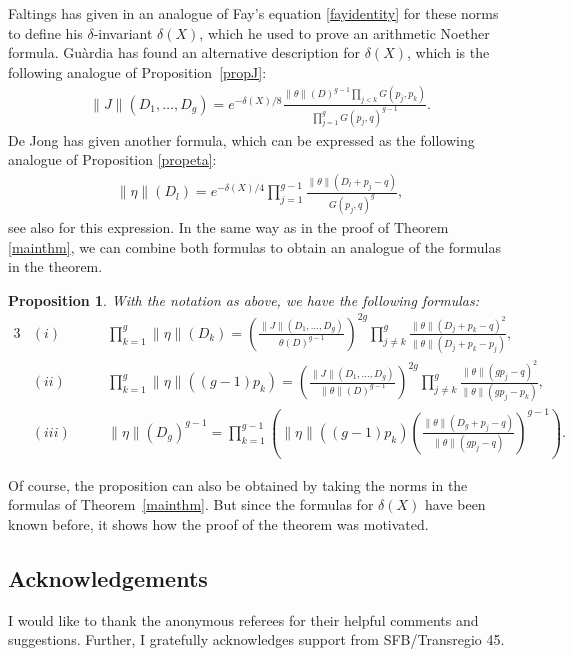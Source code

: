 \documentclass[10pt,a4paper]{amsart}
\numberwithin{equation}{section}
\newtheorem{Proposition}[Theorem]{Proposition}
 { \theoremstyle{definition}
\newtheorem{Definition}[Theorem]{Definition}
\newtheorem{Note}[Theorem]{Note}
\newtheorem{Example}[Theorem]{Example}
\newtheorem{Remark}[Theorem]{Remark} }
\begin{document}
Faltings has given in \cite[p.~402]{Fal84} an analogue of Fay's equation \eqref{fayidentity} for these norms to define his $\delta$-invariant $\delta(X)$, which he used to prove an arithmetic Noether formula. Gu\`ardia \cite[Corollary 3.6]{Gua99} has found an alternative description for $\delta(X)$, which is the following analogue of Proposition~\ref{propJ}:
\begin{align}\label{equguardia}
	\|J\|(D_{1},\dots,D_{g})=e^{-\delta(X)/8}\frac{\|\theta\|(D)^{g-1}\prod_{j<k}G(p_{j},p_{k})}{\prod_{j=1}^gG(p_{j},q)^{g-1}}.
\end{align}
De Jong \cite[Theorem 4.4]{dJo08} has given another formula, which can be expressed as the following analogue of Proposition \ref{propeta}:
\begin{align*}
	\|\eta\|(D_l)=e^{-\delta(X)/4}\prod_{j=1}^{g-1}\frac{\|\theta\|(D_l+p_j-q)}{G(p_j,q)^g},
\end{align*}
see also \cite[equation (2.7)]{Wil17} for this expression.
In the same way as in the proof of Theorem \ref{mainthm}, we can combine both formulas to obtain an analogue of the formulas in the theorem.
\begin{Proposition}
	With the notation as above, we have the following formulas:
	\begin{alignat*}{3}
&(i)\quad &&
			\prod_{k=1}^g\|\eta\|(D_k)=\left(\frac{\|J\|(D_1,\dots,D_g)^{}}{\theta(D)^{g-1}}\right)^{2g}\prod_{j\neq k}^g\frac{\|\theta\|(D_j+p_k-q)^2}{\|\theta\|(D_j+p_k-p_j)},&\\
& (ii)\quad &&
			\prod_{k=1}^g\|\eta\|((g-1)p_k)=\left(\frac{\|J\|(D_1,\dots,D_g)^{}}{\|\theta\|(D)^{g-1}}\right)^{2g}\prod_{j\neq k}^g\frac{\|\theta\|(gp_j-q)^2}{\|\theta\|(gp_j-p_k)},&\\
& (iii)\quad &&
			\|\eta\|(D_g)^{g-1}=\prod_{k=1}^{g-1}\left(\|\eta\|((g-1)p_k)\left(\frac{\|\theta\|(D_g+p_j-q)}{\|\theta\|(gp_j-q)}\right)^{g-1}\right).&
		\end{alignat*}
\end{Proposition}
Of course, the proposition can also be obtained by taking the norms in the formulas of Theorem~\ref{mainthm}. But since the formulas for $\delta(X)$ have been known before, it shows how the proof of the theorem was motivated.

\subsection*{Acknowledgements}
I would like to thank the anonymous referees for their helpful comments and suggestions.
Further, I gratefully acknowledges support from SFB/Transregio 45.
\end{document}
